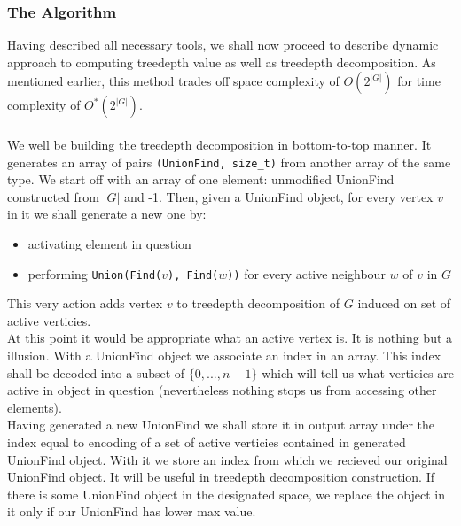 \subsubsection{The Algorithm}
Having described all necessary tools, we shall now proceed to describe dynamic approach to computing treedepth value as well as treedepth decomposition. As mentioned earlier, this method trades off space complexity of $O\left(2^{\left|G\right|}\right)$ for time complexity of  $O^{*}\left(2^{\left|G\right|}\right)$.\\\\
We well be building the treedepth decomposition in bottom-to-top manner. It generates an array of pairs \texttt{(UnionFind, size\_t)} from another array of the same type. We start off with an array of one element: unmodified UnionFind constructed from $\left|G\right|$ and -1. Then, given a UnionFind object, for every vertex $v$ in it we shall generate a new one by:
\begin{itemize}
	\item activating element in question
	\item performing \texttt{Union(Find($v$), Find($w$))} for every active neighbour $w$ of $v$ in $G$
\end{itemize}
This very action adds vertex $v$ to treedepth decomposition of $G$ induced on set of active verticies.\\
At this point it would be appropriate what an active vertex is. It is nothing but a illusion. With a UnionFind object we associate an index in an array. This index shall be decoded into a subset of $\{0,...,n-1\}$ which will tell us what verticies are active in object in question (nevertheless nothing stops us from accessing other elements).\\
Having generated a new UnionFind we shall store it in output array under the index equal to encoding of a set of active verticies contained in generated UnionFind object. With it we store an index from which we recieved our original UnionFind object. It will be useful in treedepth decomposition construction. If there is some UnionFind object in the designated space, we replace the object in it only if our UnionFind has lower max value.

